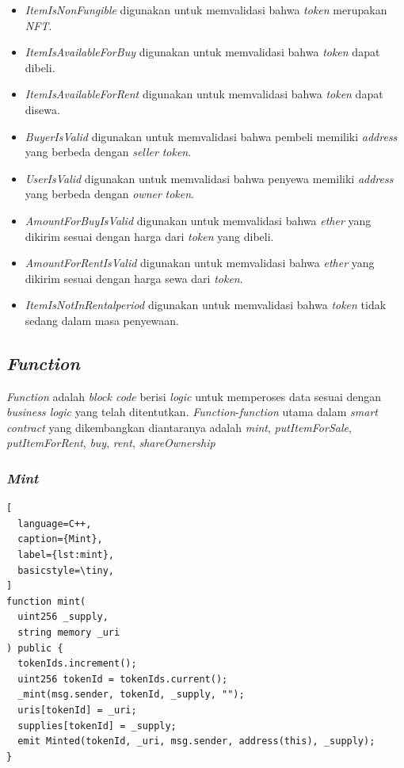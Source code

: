 \begin{itemize}
  \item \emph{ItemIsNonFungible} digunakan untuk memvalidasi bahwa \emph{token} merupakan \emph{NFT}.
  \item \emph{ItemIsAvailableForBuy} digunakan untuk memvalidasi bahwa \emph{token} dapat dibeli.
  \item \emph{ItemIsAvailableForRent} digunakan untuk memvalidasi bahwa \emph{token} dapat disewa.
  \item \emph{BuyerIsValid} digunakan untuk memvalidasi bahwa pembeli memiliki \emph{address} yang berbeda dengan \emph{seller} \emph{token}.
  \item \emph{UserIsValid} digunakan untuk memvalidasi bahwa penyewa memiliki \emph{address} yang berbeda dengan \emph{owner} \emph{token}.
  \item \emph{AmountForBuyIsValid} digunakan untuk memvalidasi bahwa \emph{ether} yang dikirim sesuai dengan harga dari \emph{token} yang dibeli.
  \item \emph{AmountForRentIsValid} digunakan untuk memvalidasi bahwa \emph{ether} yang dikirim sesuai dengan harga sewa dari \emph{token}.
  \item \emph{ItemIsNotInRentalperiod} digunakan untuk memvalidasi bahwa \emph{token} tidak sedang dalam masa penyewaan.
\end{itemize}

\subsection{\emph{Function}}

\emph{Function} adalah \emph{block code} berisi \emph{logic} untuk memperoses data sesuai dengan \emph{business logic} yang telah ditentutkan. \emph{Function}-\emph{function} utama dalam \emph{smart contract} yang dikembangkan diantaranya adalah \emph{mint}, \emph{putItemForSale}, \emph{putItemForRent}, \emph{buy}, \emph{rent}, \emph{shareOwnership}

\subsubsection{\emph{Mint}}

\begin{lstlisting}[
  language=C++,
  caption={Mint},
  label={lst:mint},
  basicstyle=\tiny,
]
function mint(
  uint256 _supply,
  string memory _uri
) public {
  tokenIds.increment();
  uint256 tokenId = tokenIds.current();
  _mint(msg.sender, tokenId, _supply, "");
  uris[tokenId] = _uri;
  supplies[tokenId] = _supply;
  emit Minted(tokenId, _uri, msg.sender, address(this), _supply);
}
\end{lstlisting}

